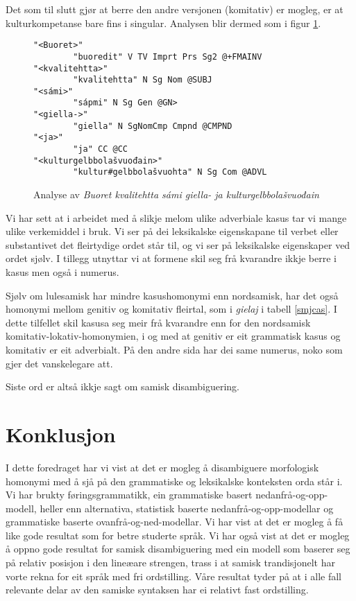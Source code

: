 \documentclass[a4paper,nynorsk]{article}
\begin{document}
Det som til slutt gjør at berre den andre versjonen (komitativ) er mogleg, er  at kulturkompetanse bare fins i singular. Analysen blir dermed som i figur \ref{kvalianalyse}.%


\begin{figure}[htbp]
\begin{center}
\begin{verbatim}
"<Buoret>"
        "buoredit" V TV Imprt Prs Sg2 @+FMAINV
"<kvalitehtta>"
        "kvalitehtta" N Sg Nom @SUBJ
"<sámi>"
        "sápmi" N Sg Gen @GN>
"<giella->"
        "giella" N SgNomCmp Cmpnd @CMPND
"<ja>"
        "ja" CC @CC
"<kulturgelbbolašvuođain>"
        "kultur#gelbbolašvuohta" N Sg Com @ADVL
\end{verbatim}
\caption{Analyse av \textit{Buoret kvalitehtta sámi giella- ja kulturgelbbolašvuođain}}
\label{kvalianalyse}
\end{center}
\end{figure}


Vi har sett at i arbeidet med å slikje melom ulike adverbiale kasus tar vi mange ulike verkemiddel i bruk. Vi ser på dei leksikalske eigenskapane til verbet eller substantivet det fleirtydige ordet står til, og vi ser på leksikalske eigenskaper ved ordet sjølv. I tillegg utnyttar vi at formene skil seg frå kvarandre ikkje berre i kasus men også i numerus. %

Sjølv om lulesamisk har mindre kasushomonymi enn nordsamisk, har det også homonymi mellom genitiv og komitativ fleirtal, som i \textit{gielaj} i tabell \ref{smjcas}. I dette tilfellet skil kasusa seg meir frå kvarandre enn for den nordsamisk komitativ-lokativ-homonymien, i og med at genitiv er eit grammatisk kasus og komitativ er eit adverbialt. På den andre sida har dei same numerus, noko som gjer det vanskelegare att. %

Siste ord er altså ikkje sagt om samisk disambiguering. %

\section{Konklusjon}


I dette foredraget har vi vist at det er mogleg å disambiguere morfologisk homonymi med å sjå på den grammatiske og leksikalske konteksten orda står i. Vi har brukty føringsgrammatikk, ein grammatiske basert nedanfrå-og-opp-modell, heller enn alternativa, statistisk baserte nedanfrå-og-opp-modellar og grammatiske baserte ovanfrå-og-ned-modellar. Vi har vist at det er mogleg å få like gode resultat som for betre studerte språk. Vi har også vist at det er mogleg å oppno gode resultat for samisk disambiguering med ein modell som baserer seg på relativ posisjon i den lineæare strengen, trass i at samisk trandisjonelt har vorte rekna for eit språk med fri ordstilling. Våre resultat tyder på at i alle fall relevante delar av den samiske syntaksen har ei relativt fast ordstilling.  %
\end{document}
